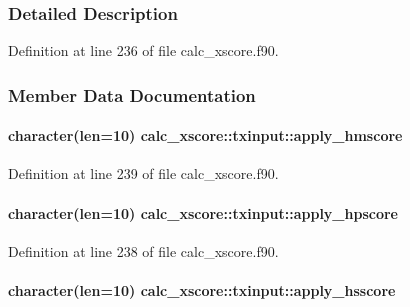 \subsubsection{Detailed Description}


Definition at line 236 of file calc\-\_\-xscore.\-f90.



\subsubsection{Member Data Documentation}
\hypertarget{structcalc__xscore_1_1txinput_a80ad95b803df59eddb4c71bab243e490}{
\paragraph[{apply\-\_\-hmscore}]{\setlength{\rightskip}{0pt plus 5cm}character(len=10) calc\-\_\-xscore\-::txinput\-::apply\-\_\-hmscore}}\label{structcalc__xscore_1_1txinput_a80ad95b803df59eddb4c71bab243e490}


Definition at line 239 of file calc\-\_\-xscore.\-f90.

\hypertarget{structcalc__xscore_1_1txinput_ab7f3e902b07ea664b0bc35e83c395a33}{
\paragraph[{apply\-\_\-hpscore}]{\setlength{\rightskip}{0pt plus 5cm}character(len=10) calc\-\_\-xscore\-::txinput\-::apply\-\_\-hpscore}}\label{structcalc__xscore_1_1txinput_ab7f3e902b07ea664b0bc35e83c395a33}


Definition at line 238 of file calc\-\_\-xscore.\-f90.

\hypertarget{structcalc__xscore_1_1txinput_a662e402c9e1def2eb44860c177e554d5}{
\paragraph[{apply\-\_\-hsscore}]{\setlength{\rightskip}{0pt plus 5cm}character(len=10) calc\-\_\-xscore\-::txinput\-::apply\-\_\-hsscore}}\label{structcalc__xscore_1_1txinput_a662e402c9e1def2eb44860c177e554d5}


